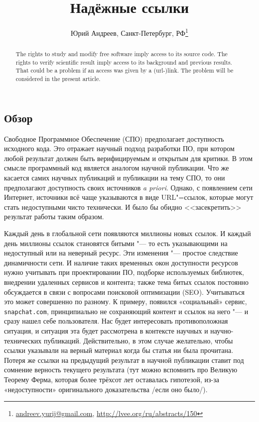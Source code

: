 \documentclass[10pt, a5paper]{article}
\begin{document}
\title{Надёжные ссылки}
\author{Юрий Андреев, Санкт-Петербург, РФ\footnote{\url{andreev.yurij@gmail.com}, \url{http://lvee.org/ru/abstracts/150}}}
\maketitle
\begin{abstract}
The rights to study and modify free software imply access to its source code.
The rights to verify scientific result imply access to its background and
previous results. That could be a problem if an access was given by a (url-)link.
The problem will be considered in the present article.
\end{abstract}

\subsection*{Обзор}
 
Свободное Программное Обеспечение (СПО) предполагает доступность исходного 
кода. Это отражает научный подход разработки ПО, при 
котором любой результат должен быть верифицируемым и открытым для 
критики. В этом смысле программный код является аналогом
научной публикации. Что же касается самих 
научных публикаций и публикации на тему СПО, то они предполагают 
доступность своих источников \emph{a priori}.   
Однако, с появлением сети Интернет, источники всё чаще указываются
в виде URL"=ссылок, которые могут стать недоступными чисто технически.
И было бы обидно <<засекретить>> результат работы таким образом. 

Каждый день в глобальной сети появляются миллионы новых  ссылок.
И  каждый  день  миллионы  ссылок  становятся  битыми "--- то   есть
указывающими на недоступный или на неверный ресурс. Эти изменения  "---
простое следствие динамичности  сети.  И  наличие  таких   временных
окон доступности ресурсов нужно  учитывать  при  проектировании  ПО,
подборке используемых  библиотек,  внедрении  удаленных  сервисов  и
контента; также тема битых ссылок постоянно обсуждается  в  связи  с
вопросами  поисковой  оптимизации  (SEO).   Учитываться  это   может
совершенно по разному.  К  примеру,  появился  «социальный»  сервис,
\texttt{snapchat.com}, принципиально  не  сохраняющий  контент  и  
ссылок  на него  "--- и  сразу  нашел  себе  пользователя.  
Нас  будет  интересовать
противоположная  ситуация,  и  ситуация  эта  будет  рассмотрена   в
контексте научных и научно-технических публикаций. Действительно,  в
этом случае желательно, чтобы ссылки указывали  на  верный  материал
когда бы статья ни была прочитана. Потеря же  ссылки  на  предыдущий
результат  в  научной  публикации  ставит  под   сомнение   верность
текущего  результата (тут  можно  вспомнить  про  Великую  Теорему
Ферма,  которая  более  трёхсот  лет  оставалась  гипотезой,   из-за
«недоступности» оригинального доказательства /если оно было/).
\end{document}
